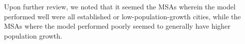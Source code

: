 Upon further review, we noted that it seemed the MSAs wherein the model performed well were all established or low-population-growth cities, while the MSAs where the model performed poorly seemed to generally have higher population growth. 


%    
%

